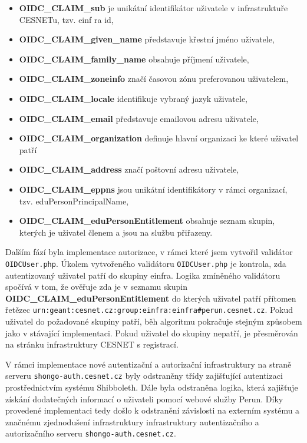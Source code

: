 \documentclass[
  printed, %
  twoside, %
  table,   %
  nolof,     %
  nolot,     %
]{fithesis3}
\begin{document}
\begin{itemize}
    \item \textbf{OIDC\_CLAIM\_sub} je unikátní identifikátor uživatele v infrastruktuře CESNETu, tzv. einf   ra id,
    \item \textbf{OIDC\_CLAIM\_given\_name} představuje křestní jméno uživatele,
    \item \textbf{OIDC\_CLAIM\_family\_name} obsahuje příjmení uživatele,
    \item \textbf{OIDC\_CLAIM\_zoneinfo} značí časovou zónu preferovanou uživatelem, 
    \item \textbf{OIDC\_CLAIM\_locale} identifikuje vybraný jazyk uživatele,
    \item \textbf{OIDC\_CLAIM\_email} představuje emailovou adresu uživatele,
    \item \textbf{OIDC\_CLAIM\_organization} definuje hlavní organizaci ke které uživatel patří
    \item \textbf{OIDC\_CLAIM\_address} značí poštovní adresu uživatele,
    \item \textbf{OIDC\_CLAIM\_eppns} jsou unikátní identifikátory v rámci organizací, tzv. eduPersonPrincipalName, 
    \item \textbf{OIDC\_CLAIM\_eduPersonEntitlement} obsahuje seznam skupin, kterých je uživatel členem a jsou na službu přiřazeny. 
\end{itemize}

Dalším fází byla implementace autorizace, v rámci které jsem vytvořil validátor \texttt{OIDCUser.php}. Úkolem vytvořeného validátoru \texttt{OIDCUser.php} je kontrola, zda autentizovaný uživatel patří do skupiny einfra. Logika zmíněného validátoru spočívá v tom, že ověřuje zda je v seznamu skupin \textbf{OIDC\_CLAIM\_eduPersonEntitlement} do kterých uživatel patří přítomen řetězec \texttt{urn:geant:cesnet.cz:group:einfra:einfra\#perun.cesnet.cz}. Pokud uživatel do požadované skupiny patří, běh algoritmu pokračuje stejným způsobem jako v stávající implementaci. Pokud uživatel do skupiny nepatří, je přesměrován na stránku infrastruktury CESNET s registrací.   

\par

V rámci implementace nové autentizační a autorizační infrastruktury na straně serveru \texttt{shongo-auth.cesnet.cz} byly odstraněny třídy zajišťující autentizaci prostřednictvím systému Shibboleth. Dále byla odstraněna logika, která zajišťuje získání dodatečných informací o uživateli pomocí webové služby Perun. Díky provedené implementaci tedy došlo k odstranění závislosti na externím systému a značnému zjednodušení infrastruktury infrastruktury autentizačního a autorizačního serveru \texttt{shongo-auth.cesnet.cz}.
\end{document}
